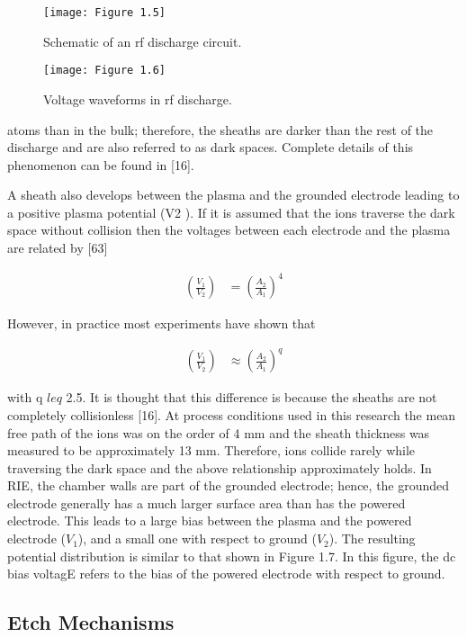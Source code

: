 \begin{figure}[H]
	\centering
	\texttt{[image: Figure 1.5]}
	\bf\caption{Schematic of an rf discharge circuit.}
	\label{fig:1.5}
\end{figure}

\begin{figure}[H]
	\centering
	\texttt{[image: Figure 1.6]}
	\bf\caption{Voltage waveforms in rf discharge.}
	\label{fig:1.6}
\end{figure}

\noindent atoms than in the bulk; therefore, the sheaths are darker than the rest of the discharge and are also referred to as dark spaces. Complete details of this phenomenon can be found in
[16].

A sheath also develops between the plasma and the grounded electrode leading to a positive plasma potential (V2 ). If it is assumed that the ions traverse the dark space without collision then the voltages between each electrode and the plasma are related by [63]

\begin{align}
	\left( \frac{V_{1}}{V_{2}} \right) &= \left( \frac{A_{2}}{A_{1}} \right) ^{4}
\end{align}

\noindent However, in practice most experiments have shown that

\begin{align}
	\left( \frac{V_{1}}{V_{2}} \right) &\approx \left( \frac{A_{2}}{A_{1}} \right) ^{q}
\end{align}


with q $leq$ 2.5. It is thought that this difference is because the sheaths are not completely collisionless [16]. At process conditions used in this research the mean free path of the ions was on the order of 4 mm and the sheath thickness was measured to be approximately 13 mm. Therefore, ions collide rarely while traversing the dark space and the above relationship approximately holds. In RIE, the chamber walls are part of the grounded electrode; hence, the grounded electrode generally has a much larger surface area than has the powered electrode. This leads to a large bias between the plasma and the powered electrode ($V_{1}$), and a small one with respect to ground ($V_{2}$). The resulting potential distribution is similar to that shown in Figure 1.7. In this figure, the dc bias voltagE refers to the bias of the powered electrode with respect to ground.


\subsection{Etch Mechanisms}

